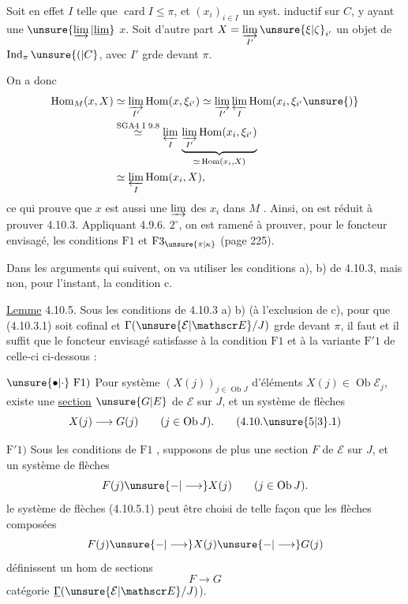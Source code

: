 Soit en effet $I$ telle que $\operatorname{card}I\leq\pi$, et  $(x_i)_{i\in I}$ un syst. inductif\unsure{$_{\pi}$} sur $C$, y ayant une $\unsure{\varinjlim|\underline{\lim}}$ $x$. Soit d'autre part $X=\underset{I'}{\varinjlim}\,\unsure{\xi|\zeta}_{i'}$ un objet de $\operatorname{Ind}_{\pi}\unsure{(|C}$, avec $I'$ grde devant $\pi$.

On a donc
\[
 \begin{aligned}
 \mathrm{Hom}_{M}(x,X)&\simeq\underset{I'}{\varinjlim}\,\mathrm{Hom}(x,\xi_{i'})
 \simeq\underset{I'}{\varinjlim}\,\underset{I}{\varprojlim}\,\mathrm{Hom}(x_i,\xi_{i'}\unsure{)}\\
 &\overset{\text{SGA4 I 9.8}}{\simeq}\underset{I}{\varprojlim}\,
 \underbrace{\underset{I'}{\varinjlim}\,\mathrm{Hom}(x_i,\xi_{i'})}_{\simeq\,\mathrm{Hom}(x_i,X)}\\
 &\simeq\underset{I}{\varprojlim}\,\mathrm{Hom}(x_i,X),
 \end{aligned}
\]
ce qui prouve que $x$ est aussi une $\varinjlim$ des $x_i$ dans $M$ .
Ainsi, on est réduit à prouver 4.10.3. Appliquant 4.9.6. $2^\circ$, on est ramené à prouver, pour le foncteur envisagé, les conditions $\mathrm F1$ et $\mathrm F3_{\unsure{\pi|\kappa}}$ (page 225).

Dans les arguments qui suivent, on va utiliser les conditions a), b) de 4.10.3, mais non, pour l'instant, la condition c.

\uline{Lemme} 4.10.5. Sous les conditions de 4.10.3 a) b) (à l'exclusion de c), pour que (4.10.3.1) soit cofinal et $\Gamma(\unsure{\mathcal E|\mathscr E}/J)$ grde devant $\pi$, il faut et il suffit que le foncteur envisagé satisfasse à la condition $\mathrm F1$   et à la variante $\mathrm F'1$ de celle-ci  ci-dessous :

$\unsure{\bullet|\cdot}\ \mathrm F1)$ Pour  système $(X(j))_{j\in\operatorname{Ob}J}$ d'éléments $X(j)\in\operatorname{Ob}\mathcal E_j$, existe une \uline{section} $\unsure{G|E}$ de $\mathcal E$ sur $J$, et un système de flèches
\[
 X(j)\longrightarrow G(j)\qquad (j\in\operatorname{Ob}J). \tag*{(4.10.\unsure{5|3}.1)}
\]

$\mathrm F'1)$ Sous les conditions de $\mathrm F1$ , supposons de plus une section $F$ de $\mathcal E$ sur $J$,
 et un système de flèches
\[
 F(j)\unsure{\mathbin{-}|\longrightarrow} X(j)\qquad (j\in\operatorname{Ob}J).
\]
  le système de flèches (4.10.5.1) peut être choisi de telle façon que les flèches composées
\[
 F(j)\unsure{\mathbin{-}|\longrightarrow} X(j)\unsure{\mathbin{-}|\longrightarrow}G(j)
\]
définissent un hom de sections
\[
 F\longrightarrow G
\]
 catégorie $\underline{\Gamma}(\unsure{\mathcal E|\mathscr E}/J)$).

